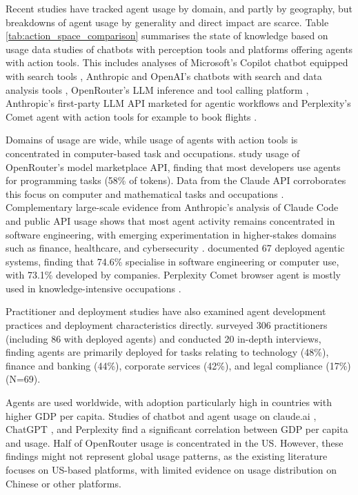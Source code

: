 \documentclass[manuscript,screen,nonacm,oneside]{acmart}
\begin{document}
Recent studies have tracked agent usage by domain, and partly by geography, but breakdowns of agent usage by generality and direct impact are scarce. Table \ref{tab:action_space_comparison} summarises the state of knowledge based on usage data studies of chatbots with perception tools and platforms offering agents with action tools. This includes analyses of Microsoft's Copilot chatbot equipped with search tools \citep{yang2025adoption}, Anthropic and OpenAI's chatbots with search and data analysis tools \citep{handa2025which} \citep{chatterji2025people}, OpenRouter's LLM inference and tool calling platform \citep{aubakirova2025state}, Anthropic's first-party LLM API marketed for agentic workflows \citep{handa2025which} and Perplexity's Comet agent with action tools for example to book flights \citep{yang2025adoption}.

Domains of usage are wide, while usage of agents with action tools is concentrated in computer-based task and occupations. \citep{aubakirova2025state} study usage of OpenRouter's model marketplace API, finding that most developers use agents for programming tasks (58\% of tokens). Data from the Claude API corroborates this focus on computer and mathematical tasks and occupations \citep{anthropic2026aeiv4}. Complementary large-scale evidence from Anthropic's analysis of Claude Code and public API usage shows that most agent activity remains concentrated in software engineering, with emerging experimentation in higher-stakes domains such as finance, healthcare, and cybersecurity \citep{anthropic2026agents}. \citep{casper2025agent} documented 67 deployed agentic systems, finding that 74.6\% specialise in software engineering or computer use, with 73.1\% developed by companies. Perplexity Comet browser agent is mostly used in knowledge-intensive occupations \citep{yang2025adoption}.

Practitioner and deployment studies have also examined agent development practices and deployment characteristics directly. \citep{pan2025measuring} surveyed 306 practitioners (including 86 with deployed agents) and conducted 20 in-depth interviews, finding agents are primarily deployed for tasks relating to technology (48\%), finance and banking (44\%), corporate services (42\%), and legal compliance (17\%) (N=69).

Agents are used worldwide, with adoption particularly high in countries with higher GDP per capita. Studies of chatbot and agent usage on claude.ai \citep{handa2025which}, ChatGPT \citep{chatterji2025people}, and Perplexity \citep{yang2025adoption} find a significant correlation between GDP per capita and usage. Half of OpenRouter usage \citep{aubakirova2025state} is concentrated in the US. However, these findings might not represent global usage patterns, as the existing literature focuses on US-based platforms, with limited evidence on usage distribution on Chinese or other platforms.
\end{document}
